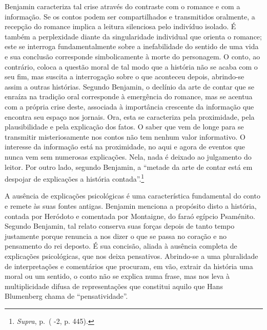 Benjamin caracteriza tal crise através do contraste com o romance e com
a informação. Se os contos podem ser compartilhados e transmitidos
oralmente, a recepção do romance implica a leitura silenciosa pelo
indivíduo isolado. É também a perplexidade diante da singularidade
individual que orienta o romance; este se interroga fundamentalmente
sobre a inefabilidade do sentido de uma vida e sua conclusão corresponde
simbolicamente à morte do personagem. O conto, ao contrário, coloca a
questão moral de tal modo que a história não se acaba com o seu fim, mas
suscita a interrogação sobre o que aconteceu depois, abrindo-se assim a
outras histórias. Segundo Benjamin, o declínio da arte de contar que se
enraíza na tradição oral corresponde à emergência do romance, mas se
acentua com a própria crise deste, associada à importância crescente da
informação que encontra seu espaço nos jornais. Ora, esta se caracteriza
pela proximidade, pela plausibilidade e pela explicação dos fatos. O
saber que vem de longe para se transmitir misteriosamente nos contos não
tem nenhum valor informativo. O interesse da informação está na
proximidade, no aqui e agora de eventos que nunca vem sem numerosas
explicações. Nela, nada é deixado ao julgamento do leitor. Por outro
lado, segundo Benjamin, a ``metade da arte de contar está em despojar de
explicações a história contada''.\footnote{\emph{Supra}, p.\,\pageref{supra3} ( -2,
  p. 445).}

A ausência de explicações psicológicas é uma característica fundamental
do conto e remete às suas fontes antigas. Benjamin menciona a propósito
disto a história, contada por Heródoto e comentada por Montaigne, do
faraó egípcio Psaménito. Segundo Benjamin, tal relato conserva suas
forças depois de tanto tempo justamente porque renuncia a nos dizer o
que se passa no coração e no pensamento do rei deposto. É sua concisão,
aliada à ausência completa de explicações psicológicas, que nos deixa
pensativos. Abrindo-se a uma pluralidade de interpretações e comentários
que procuram, em vão, extrair da história uma moral ou um sentido, o
conto não se explica numa frase, mas nos leva à multiplicidade difusa de
representações que constitui aquilo que Hans Blumenberg chama de
``pensatividade''.

